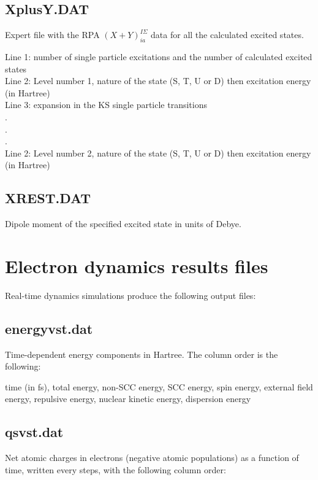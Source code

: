 \subsection{XplusY.DAT}

Expert file with the RPA  $(X+Y)^{I\Sigma}_{ia}$ data for all the calculated
excited states.

Line 1: number of single particle excitations and the number of calculated
excited states\\
Line 2: Level number 1, nature of the state (S, T, U or D) then excitation
energy (in Hartree)\\
Line 3: expansion in the KS single particle transitions\\
.\\
.\\
.\\
Line 2: Level number 2, nature of the state (S, T, U or D) then excitation
energy (in Hartree)\\

\subsection{XREST.DAT}

Dipole moment of the specified excited state in units of Debye.

\section{Electron dynamics results files}
\label{sec:tddftb_rt}

Real-time dynamics simulations produce the following output files:

\subsection{energyvst.dat}

Time-dependent energy components in Hartree. The column order is the
following:

time (in fs), total energy, non-SCC energy, SCC energy, spin energy,
external field energy, repulsive energy, nuclear kinetic energy,
dispersion energy

\subsection{qsvst.dat}

Net atomic charges in electrons (negative atomic populations) as a
function of time, written every  steps, with the
following column order:

